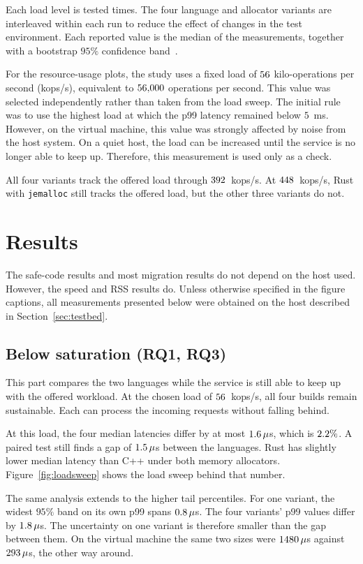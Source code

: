 \documentclass[english,oneside,a4paper,censored,csm,software-track-2020]{HYthesisML}
\begin{document}
Each load level is tested \NRepeats{} times. The four language and allocator
variants are interleaved within each run to reduce the effect of changes in
the test environment. Each reported value is the median of the measurements,
together with a bootstrap $95\%$ confidence
band~\cite{georges2007rigorous,efron1993bootstrap}.

For the resource-usage plots, the study uses a fixed load of
$56$ kilo-operations per second (kops/s), equivalent to
$56{,}000$ operations per second. This value
was selected independently rather than taken from the load sweep. The initial
rule was to use the highest load at which the p99 latency remained below
$5$~ms. However, on the virtual machine, this value was strongly affected
by noise from the host system. On a quiet host, the load can be increased
until the service is no longer able to keep up. Therefore, this measurement
is used only as a check.

All four variants track the offered load through $392$~kops/s. At
$448$~kops/s, Rust with \texttt{jemalloc} still tracks the offered
load, but the other three variants do not.

\section{Results}
The safe-code results and most migration results do not depend on the host used. 
However, the speed and RSS results do.
Unless otherwise specified in the figure captions, all measurements presented below
were obtained on the host described in Section~\ref{sec:testbed}.
\subsection{Below saturation (RQ1, RQ3)}\label{sec:perfresults}
This part compares the two languages while the service is still able to
keep up with the offered workload. At the chosen load of $56$~kops/s,
all four builds remain sustainable. Each can process the incoming requests
without falling behind.

At this load, the four median latencies differ by at most
$1.6\,\mu$s, which is $2.2\%$. A paired test still finds a
gap of $1.5\,\mu$s between the languages. Rust has slightly
lower median latency than C++ under both memory allocators.
Figure~\ref{fig:loadsweep} shows the load sweep behind that number.

The same analysis extends to the higher tail percentiles. For one variant,
the widest $95\%$ band on its own p99 spans $0.8\,\mu$s. The four
variants' p99 values differ by $1.8\,\mu$s. The uncertainty on
one variant is therefore smaller than the gap between them. On the virtual
machine the same two sizes were $1480\,\mu$s against
$293\,\mu$s, the other way around.
\end{document}
